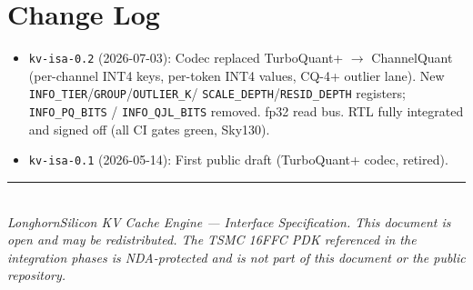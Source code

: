\documentclass[11pt]{article}
\begin{document}
\section{Change Log}
\label{sec:changelog}

\begin{itemize}
\item \texttt{kv-isa-0.2} (2026-07-03): Codec replaced TurboQuant+ $\to$
      ChannelQuant (per-channel INT4 keys, per-token INT4 values, CQ-4+ outlier
      lane). New \texttt{INFO\_TIER}/\texttt{GROUP}/\texttt{OUTLIER\_K}/
      \texttt{SCALE\_DEPTH}/\texttt{RESID\_DEPTH} registers; \texttt{INFO\_PQ\_BITS}
      / \texttt{INFO\_QJL\_BITS} removed. fp32 read bus. RTL fully integrated and
      signed off (all CI gates green, Sky130).
\item \texttt{kv-isa-0.1} (2026-05-14): First public draft (TurboQuant+ codec,
      retired).
\end{itemize}

\vspace{0.5in}
\noindent\rule{\textwidth}{0.4pt}\\
\noindent\small\textit{LonghornSilicon KV Cache Engine --- Interface Specification.
This document is open and may be redistributed. The TSMC 16FFC PDK referenced
in the integration phases is NDA-protected and is not part of this document
or the public repository.}
\end{document}
